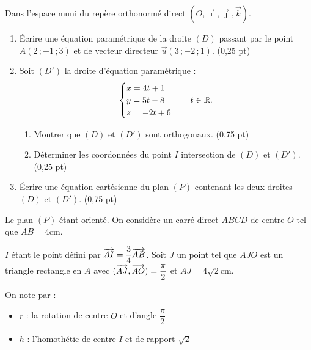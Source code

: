 

Dans l'espace muni du repère orthonormé direct $(O,\vec{\imath},\vec{\jmath},\vec{k})$.

\begin{enumerate}
	\item Écrire une équation paramétrique de la droite $(D)$ passant par le point $A(2\,;-1\,;3)$ et de vecteur directeur $\vec{u}(3\,;-2\,;1)$. \hfill (0,25 pt)
	\item Soit $(D')$ la droite d'équation paramétrique :
	$$
	\begin{cases}
		x = 4t+1 \\
		y = 5t-8 \\
		z = -2t+6
	\end{cases}
	\quad t \in \mathbb{R}.
	$$
	\begin{enumerate}
		\item Montrer que $(D)$ et $(D')$ sont orthogonaux. \hfill (0,75 pt)
		\item Déterminer les coordonnées du point $I$ intersection de $(D)$ et $(D')$. \hfill (0,25 pt)
	\end{enumerate}
	\item Écrire une équation cartésienne du plan $(P)$ contenant les deux droites $(D)$ et $(D')$. \hfill (0,75 pt)
\end{enumerate}




Le plan $(P)$ étant orienté. On considère un carré direct $ABCD$ de centre $O$ tel que $AB = 4\text{cm}$.

$I$ étant le point défini par $\overrightarrow{AI} = \dfrac{3}{4}\overrightarrow{AB}$. Soit $J$ un point tel que $AJO$ est un triangle rectangle en $A$ avec $(\overrightarrow{AJ},\overrightarrow{AO}) = \dfrac{\pi}{2}$ et $AJ = 4\sqrt{2}\text{cm}$.

On note par :
\begin{itemize}[label=\textbullet]
	\item $r$ : la rotation de centre $O$ et d'angle $\dfrac{\pi}{2}$
	\item $h$ : l'homothétie de centre $I$ et de rapport $\sqrt{2}$
\end{itemize}

